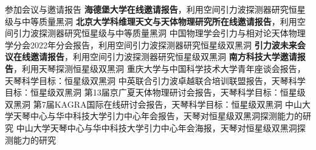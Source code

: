 
\begin{rubric}{参加会议与邀请报告}
    \entry*[2023] \textbf{海德堡大学在线邀请报告}，利用空间引力波探测器研究恒星级与中等质量黑洞
    \entry*[2023] \textbf{北京大学科维理天文与天体物理研究所在线邀请报告}，利用空间引力波探测器研究恒星级与中等质量黑洞
    \entry*[2022] 中国物理学会引力与相对论天体物理学分会2022年分会报告，利用空间引力波探测器研究恒星级双黑洞
    \entry*[2022] \textbf{引力波未来会议在线邀请报告}，利用空间引力波探测器研究恒星级双黑洞
    \entry*[2022] \textbf{南方科技大学邀请报告}，利用天琴探测恒星级双黑洞 
    \entry*[2021] 重庆大学与中国科学技术大学青年座谈会报告，天琴科学目标：恒星级双黑洞
    \entry*[2021] 中英联合引力波卓越联合培训联盟报告，天琴科学目标：恒星级双黑洞
    \entry*[2020] 第13届京广夏天体物理研讨会报告，天琴科学目标：恒星级双黑洞
    \entry*[2020] 第7届KAGRA国际在线研讨会报告，天琴科学目标：恒星级双黑洞
    \entry*[2019] 中山大学天琴中心与华中科技大学引力中心年会报告，天琴对恒星级双黑洞探测能力的研究 
    \entry*[2018] 中山大学天琴中心与华中科技大学引力中心年会海报，天琴对恒星级双黑洞探测能力的研究
\end{rubric}
